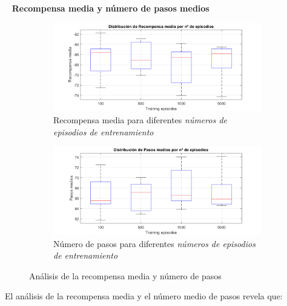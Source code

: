 \
\newpage
\textbf{Recompensa media y número de pasos medios}

\begin{figure}[H]
    \centering
    \begin{subfigure}{0.8\textwidth}
        \centering
        \includegraphics[width=\textwidth]{../../experiments/directEstimation/experiment-2/results/reward.png}
        \caption{Recompensa media para diferentes \textit{números de episodios de entrenamiento}}
        \label{fig:directEstimation2-subfig-reward}
    \end{subfigure}
    \hfill
    \begin{subfigure}{0.8\textwidth}
        \centering
        \includegraphics[width=\textwidth]{../../experiments/directEstimation/experiment-2/results/steps.png}
        \caption{Número de pasos para diferentes \textit{números de episodios de entrenamiento}}
        \label{fig:directEstimation2-subfig-steps}
    \end{subfigure}
    \caption{Análisis de la recompensa media y número de pasos}
    \label{fig:directEstimation2-reward}
\end{figure}

El análisis de la recompensa media y el número medio de pasos revela que:

